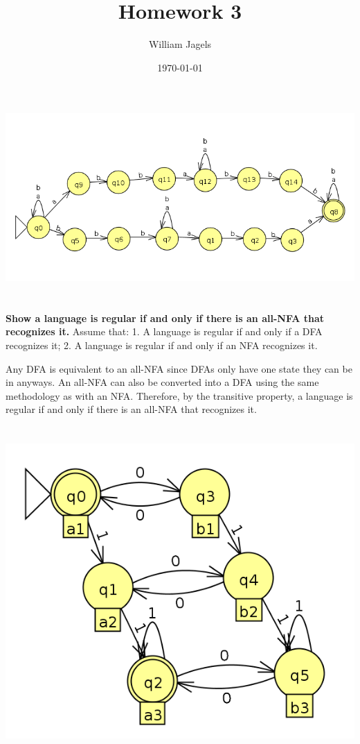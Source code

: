 \documentclass[a4paper,12pt]{article}
\title{Homework 3}
\author{William Jagels}
\date{\today}
\begin{document}
\maketitle

\section{}
\includegraphics[width=15cm]{q1}
\section{}
\textbf{Show a language is regular if and only if there is an all-NFA that recognizes it.}
Assume that:
1. A language is regular if and only if a DFA recognizes it;
2. A language is regular if and only if an NFA recognizes it.

Any DFA is equivalent to an all-NFA since DFAs only have one state they can be in anyways.
An all-NFA can also be converted into a DFA using the same methodology as with an NFA.
Therefore, by the transitive property, a language is regular if and only if there is an all-NFA that recognizes it.
\section{}
\includegraphics[width=15cm]{q3}
\end{document}
